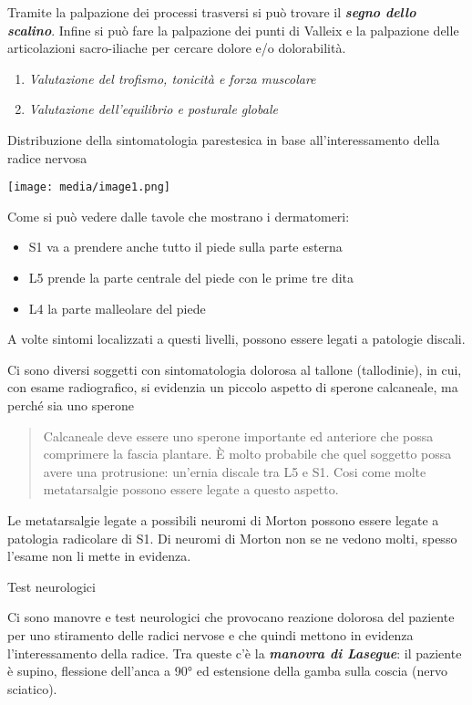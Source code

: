 \documentclass[]{article}
\begin{document}
Tramite la palpazione dei processi trasversi si può trovare il
\textbf{\emph{segno dello scalino}}. Infine si può fare la palpazione
dei punti di Valleix e la palpazione delle articolazioni sacro-iliache
per cercare dolore e/o dolorabilità.

\begin{enumerate}
\def\labelenumi{\arabic{enumi}.}
\item
  \emph{Valutazione del \emph{trofismo, tonicità e forza muscolare}}
\item
  \emph{Valutazione dell'\emph{equilibrio} e \emph{posturale globale}}
\end{enumerate}

Distribuzione della sintomatologia parestesica in base
all'interessamento della radice nervosa

\texttt{[image: media/image1.png]}

Come si può vedere dalle tavole che mostrano i dermatomeri:

\begin{itemize}
\item
  S1 va a prendere anche tutto il piede sulla parte esterna
\item
  L5 prende la parte centrale del piede con le prime tre dita
\item
  L4 la parte malleolare del piede
\end{itemize}

A volte sintomi localizzati a questi livelli, possono essere legati a
patologie discali.

Ci sono diversi soggetti con sintomatologia dolorosa al tallone
(tallodinie), in cui, con esame radiografico, si evidenzia un piccolo
aspetto di sperone calcaneale, ma perché sia uno sperone

\begin{quote}
Calcaneale deve essere uno sperone importante ed anteriore che possa
comprimere la fascia plantare. È molto probabile che quel soggetto possa
avere una protrusione: un'ernia discale tra L5 e S1. Cosi come molte
metatarsalgie possono essere legate a questo aspetto.
\end{quote}

Le metatarsalgie legate a possibili neuromi di Morton possono essere
legate a patologia radicolare di S1. Di neuromi di Morton non se ne
vedono molti, spesso l'esame non li mette in evidenza.

Test neurologici

Ci sono manovre e test neurologici che provocano reazione dolorosa del
paziente per uno stiramento delle radici nervose e che quindi mettono in
evidenza l'interessamento della radice. Tra queste c'è la
\textbf{\emph{manovra di Lasegue}}: il paziente è supino, flessione
dell'anca a 90° ed estensione della gamba sulla coscia (nervo sciatico).
\end{document}
